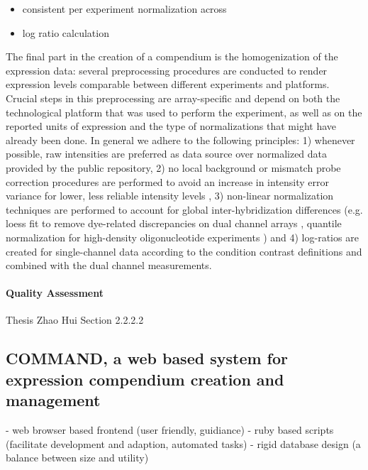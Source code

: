 \begin{itemize}
\item consistent per experiment normalization across
\item log ratio calculation
\end{itemize}

The final part in the creation of a compendium is the homogenization of the 
expression data: several preprocessing procedures are conducted to render 
expression levels comparable between different experiments and platforms. 
%
Crucial steps in this preprocessing are array-specific and depend on both the 
technological platform that was used to perform the experiment, as well as on 
the reported units of expression and the type of normalizations that might have 
already been done. 
%
In general we adhere to the following principles: 
%
1) whenever possible, raw intensities are preferred as data source over 
normalized data provided by the public repository, 
%
2) no local background or mismatch probe correction procedures are performed to 
avoid an increase in intensity error variance for lower, less reliable 
intensity levels \cite{Ritchie2007,Engelen2006,Li2001}, 
%
3) non-linear normalization techniques are performed to account for global 
inter-hybridization differences (e.g. loess fit to remove dye-related 
discrepancies on dual channel arrays \cite{Yang2002}, quantile normalization 
for high-density oligonucleotide experiments \cite{Bolstad2003}) and 
%
4) log-ratios are created for single-channel data according to the condition 
contrast definitions and combined with the dual channel measurements.




\paragraph{Quality Assessment}

Thesis Zhao Hui Section 2.2.2.2




\subsection{COMMAND, a web based system for expression compendium creation and management}


- web browser based frontend (user friendly, guidiance) 
- ruby based scripts (facilitate development and adaption, automated tasks) 
- rigid database design (a balance between size and utility) 

